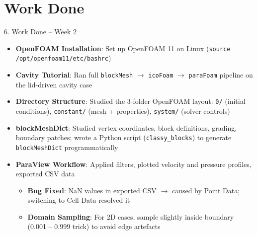 \documentclass[dvipsnames,mathserif]{beamer}
\begin{document}
\section{Work Done}
\begin{frame}{6. Work Done -- Week 2}
    \begin{itemize}
        \item \textbf{OpenFOAM Installation}: Set up OpenFOAM 11 on Linux (\texttt{source /opt/openfoam11/etc/bashrc})
        \item \textbf{Cavity Tutorial}: Ran full \texttt{blockMesh} $\rightarrow$ \texttt{icoFoam} $\rightarrow$ \texttt{paraFoam} pipeline on the lid-driven cavity case
        \item \textbf{Directory Structure}: Studied the 3-folder OpenFOAM layout: \texttt{0/} (initial conditions), \texttt{constant/} (mesh + properties), \texttt{system/} (solver controls)
        \item \textbf{blockMeshDict}: Studied vertex coordinates, block definitions, grading, boundary patches; wrote a Python script (\texttt{classy\_blocks}) to generate \texttt{blockMeshDict} programmatically
        \item \textbf{ParaView Workflow}: Applied filters, plotted velocity and pressure profiles, exported CSV data
        \begin{itemize}
            \item \textbf{Bug Fixed}: NaN values in exported CSV $\rightarrow$ caused by Point Data; switching to Cell Data resolved it
            \item \textbf{Domain Sampling}: For 2D cases, sample slightly inside boundary (0.001 -- 0.999 trick) to avoid edge artefacts
        \end{itemize}
    \end{itemize}
\end{frame}


\end{document}
